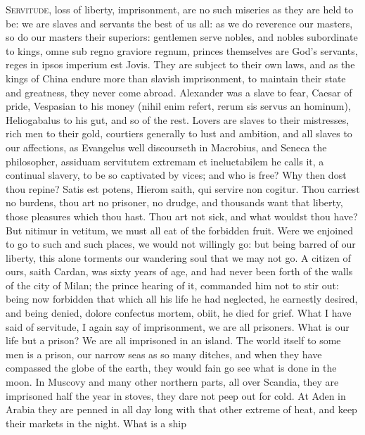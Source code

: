 {\lettrine{S}{ervitude}, loss of liberty, imprisonment, are no such miseries as they
are held to be: we are slaves and servants the best of us all: as we do
reverence our masters, so do our masters their superiors: gentlemen
serve nobles, and nobles subordinate to kings, omne sub regno graviore
regnum, princes themselves are God's servants, reges in ipsos imperium
est Jovis. They are subject to their own laws, and as the kings of
China endure more than slavish imprisonment, to maintain their state
and greatness, they never come abroad. Alexander was a slave to fear,
Caesar of pride, Vespasian to his money (nihil enim refert, rerum sis
servus an hominum),  Heliogabalus to his gut, and so of the rest.
Lovers are slaves to their mistresses, rich men to their gold,
courtiers generally to lust and ambition, and all slaves to our
affections, as Evangelus well discourseth in Macrobius, and
Seneca the philosopher, assiduam servitutem extremam et
ineluctabilem he calls it, a continual slavery, to be so captivated by
vices; and who is free? Why then dost thou repine? Satis est potens,
Hierom saith, qui servire non cogitur. Thou carriest no burdens, thou
art no prisoner, no drudge, and thousands want that liberty, those
pleasures which thou hast. Thou art not sick, and what wouldst thou
have? But nitimur in vetitum, we must all eat of the forbidden fruit.
Were we enjoined to go to such and such places, we would not willingly
go: but being barred of our liberty, this alone torments our wandering
soul that we may not go. A citizen of ours, saith Cardan, was
sixty years of age, and had never been forth of the walls of the city
of Milan; the prince hearing of it, commanded him not to stir out:
being now forbidden that which all his life he had neglected, he
earnestly desired, and being denied, dolore confectus mortem, obiit, he
died for grief.
What I have said of servitude, I again say of imprisonment, we are all
prisoners. What is our life but a prison? We are all imprisoned
in an island. The world itself to some men is a prison, our narrow seas
as so many ditches, and when they have compassed the globe of the
earth, they would fain go see what is done in the moon. In
Muscovy and many other northern parts, all over Scandia, they are
imprisoned half the year in stoves, they dare not peep out for cold. At
Aden in Arabia they are penned in all day long with that other
extreme of heat, and keep their markets in the night. What is a ship
}
